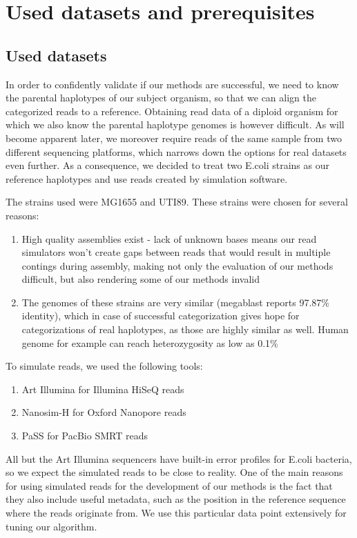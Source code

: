 \chapter{Used datasets and prerequisites}

\section{Used datasets}

In order to confidently validate if our methods are successful, we need to know the parental haplotypes of our subject organism, so that we can align the categorized reads to a reference. Obtaining read data of a diploid organism for which we also know the parental haplotype genomes is however difficult. As will become apparent later, we moreover require reads of the same sample from two different sequencing platforms, which narrows down the options for real datasets even further. As a consequence, we decided to treat two E.coli strains as our reference haplotypes and use reads created by simulation software.

The strains used were MG1655 and UTI89. These strains were chosen for several reasons:
\begin{enumerate}
\item{High quality assemblies exist - lack of unknown bases means our read simulators won’t create gaps between reads that would result in multiple contings during assembly, making not only the evaluation of our methods difficult, but also rendering some of our methods invalid}
\item{The genomes of these strains are very similar (megablast\cite{megablast} reports 97.87\% identity), which in case of successful categorization gives hope for categorizations of real haplotypes, as those are highly similar as well. Human genome for example can reach heterozygosity as low as 0.1\%\cite{koren2018complete}}
\end{enumerate}

To simulate reads, we used the following tools:
\begin{enumerate}
	\item{Art Illumina for Illumina HiSeQ reads\cite{huang2012art}}
	\item{Nanosim-H for Oxford Nanopore reads\cite{yang2017nanosim} \cite{nanosimh}}
	\item{PaSS for PacBio SMRT reads\cite{zhang2019pass}}
\end{enumerate}

All but the Art Illumina sequencers have built-in error profiles for E.coli bacteria, so we expect the simulated reads to be close to reality.
One of the main reasons for using simulated reads for the development of our methods is the fact that they also include useful metadata, such as the position in the reference sequence where the reads originate from. We use this particular data point extensively for tuning our algorithm.

